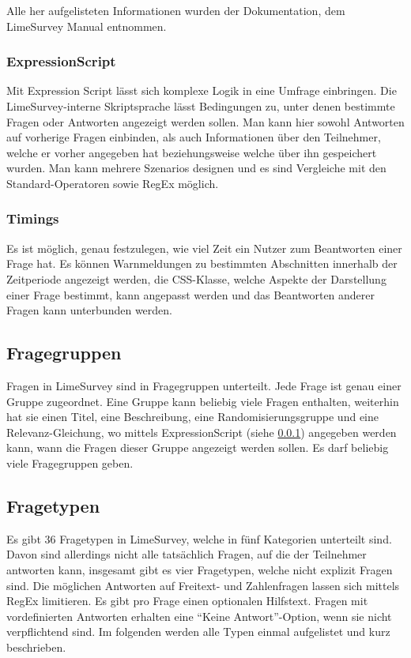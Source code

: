 Alle her aufgelisteten Informationen wurden der Dokumentation, dem LimeSurvey Manual\cite{lsm} entnommen.

\subsubsection{ExpressionScript}
\label{m:expr_script}
Mit Expression Script lässt sich komplexe Logik in eine Umfrage einbringen.
Die LimeSurvey-interne Skriptsprache lässt Bedingungen zu, unter denen bestimmte Fragen oder Antworten angezeigt werden sollen.
Man kann hier sowohl Antworten auf vorherige Fragen einbinden, als auch Informationen über den Teilnehmer, welche er vorher angegeben hat beziehungsweise welche über ihn gespeichert wurden.
Man kann mehrere Szenarios designen und es sind Vergleiche mit den Standard-Operatoren sowie RegEx möglich.

\subsubsection{Timings}

Es ist möglich, genau festzulegen, wie viel Zeit ein Nutzer zum Beantworten einer Frage hat.
Es können Warnmeldungen zu bestimmten Abschnitten innerhalb der Zeitperiode angezeigt werden, die CSS-Klasse, welche Aspekte der Darstellung einer Frage bestimmt, kann angepasst werden und das Beantworten anderer Fragen kann unterbunden werden.

\subsection{Fragegruppen}

Fragen in LimeSurvey sind in Fragegruppen unterteilt. Jede Frage ist genau einer Gruppe zugeordnet.
Eine Gruppe kann beliebig viele Fragen enthalten, weiterhin hat sie einen Titel, eine Beschreibung, eine Randomisierungsgruppe und eine Relevanz-Gleichung, wo mittels ExpressionScript (siehe \cref{m:expr_script}) angegeben werden kann, wann die Fragen dieser Gruppe angezeigt werden sollen.
Es darf beliebig viele Fragegruppen geben.

\subsection{Fragetypen}
\label{met:q_types}

Es gibt 36 Fragetypen in LimeSurvey, welche in fünf Kategorien unterteilt sind.
Davon sind allerdings nicht alle tatsächlich Fragen, auf die der Teilnehmer antworten kann, insgesamt gibt es vier Fragetypen, welche nicht explizit Fragen sind. %
Die möglichen Antworten auf Freitext- und Zahlenfragen lassen sich mittels RegEx limitieren.
Es gibt pro Frage einen optionalen Hilfstext.
Fragen mit vordefinierten Antworten erhalten eine \enquote{Keine Antwort}-Option, wenn sie nicht verpflichtend sind.
Im folgenden werden alle Typen einmal aufgelistet und kurz beschrieben.


